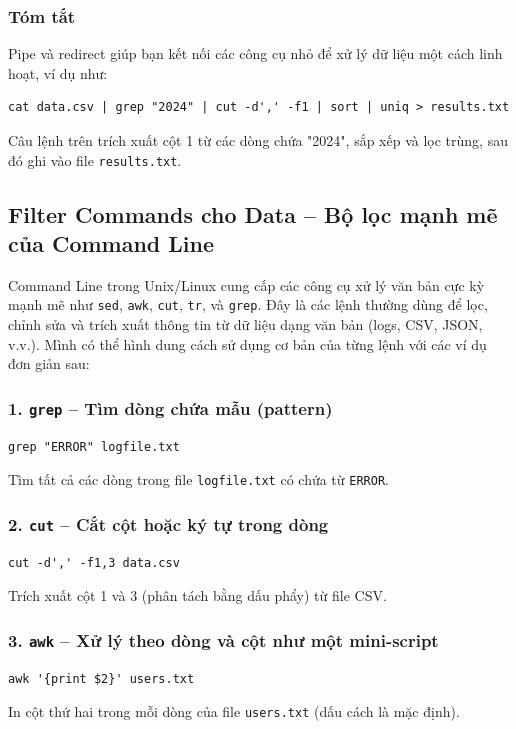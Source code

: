 \documentclass[11pt]{article}
\begin{document}
\subsubsection*{Tóm tắt}

Pipe và redirect giúp bạn kết nối các công cụ nhỏ để xử lý dữ liệu một cách linh hoạt, ví dụ như:

\begin{verbatim}
cat data.csv | grep "2024" | cut -d',' -f1 | sort | uniq > results.txt
\end{verbatim}

Câu lệnh trên trích xuất cột 1 từ các dòng chứa "2024", sắp xếp và lọc trùng, sau đó ghi vào file \texttt{results.txt}.

\subsection{Filter Commands cho Data – Bộ lọc mạnh mẽ của Command Line}

Command Line trong Unix/Linux cung cấp các công cụ xử lý văn bản cực kỳ mạnh mẽ như \texttt{sed}, \texttt{awk}, \texttt{cut}, \texttt{tr}, và \texttt{grep}. Đây là các lệnh thường dùng để lọc, chỉnh sửa và trích xuất thông tin từ dữ liệu dạng văn bản (logs, CSV, JSON, v.v.). Mình có thể hình dung cách sử dụng cơ bản của từng lệnh với các ví dụ đơn giản sau:
\vspace{0.5em}
\subsubsection*{1. \texttt{grep} – Tìm dòng chứa mẫu (pattern)}
\begin{verbatim}
grep "ERROR" logfile.txt
\end{verbatim}
Tìm tất cả các dòng trong file \texttt{logfile.txt} có chứa từ \texttt{ERROR}.

\vspace{0.5em}
\subsubsection*{2. \texttt{cut} – Cắt cột hoặc ký tự trong dòng}
\begin{verbatim}
cut -d',' -f1,3 data.csv
\end{verbatim}
Trích xuất cột 1 và 3 (phân tách bằng dấu phẩy) từ file CSV.

\vspace{0.5em}
\subsubsection*{3. \texttt{awk} – Xử lý theo dòng và cột như một mini-script}
\begin{verbatim}
awk '{print $2}' users.txt
\end{verbatim}
In cột thứ hai trong mỗi dòng của file \texttt{users.txt} (dấu cách là mặc định).
\end{document}
